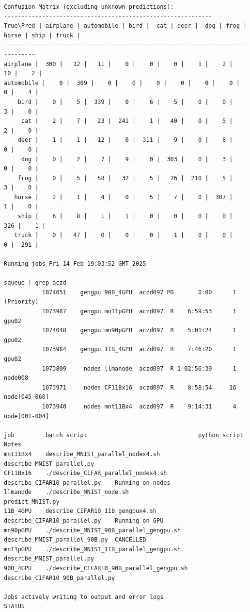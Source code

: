 \begin{verbatim}
Confusion Matrix (excluding unknown predictions):
------------------------------------------------------------
True\Pred | airplane | automobile | bird |  cat | deer |  dog | frog | horse | ship | truck |
-------------------------------------------------------------------------------
airplane |  300 |   12 |   11 |    0 |    0 |    0 |    1 |    2 |   10 |    2 |
automobile |    0 |  309 |    0 |    0 |    0 |    0 |    0 |    0 |    0 |    4 |
    bird |    0 |    5 |  339 |    0 |    6 |    5 |    0 |    0 |    3 |    0 |
     cat |    2 |    7 |   23 |  241 |    1 |   40 |    0 |    5 |    2 |    0 |
    deer |    1 |    1 |   12 |    0 |  311 |    9 |    0 |    8 |    0 |    0 |
     dog |    0 |    2 |    7 |    9 |    0 |  303 |    0 |    3 |    0 |    0 |
    frog |    0 |    5 |   58 |   32 |    5 |   26 |  210 |    5 |    3 |    0 |
   horse |    2 |    1 |    4 |    0 |    5 |    7 |    0 |  307 |    1 |    0 |
    ship |    6 |    8 |    1 |    1 |    0 |    0 |    0 |    0 |  326 |    1 |
   truck |    0 |   47 |    0 |    0 |    0 |    1 |    0 |    0 |    0 |  291 |

Running jobs Fri 14 Feb 19:03:52 GMT 2025

squeue | grep aczd
           1074051    gengpu 90B_4GPU  aczd097 PD       0:00      1 (Priority)
           1073987    gengpu mn11pGPU  aczd097  R    6:59:53      1 gpu02
           1074048    gengpu mn90pGPU  aczd097  R    5:01:24      1 gpu02
           1073984    gengpu 11B_4GPU  aczd097  R    7:46:20      1 gpu02
           1073809     nodes llmanode  aczd097  R 1-02:56:39      1 node008
           1073971     nodes CF11Bx16  aczd097  R    8:58:54     16 node[045-060]
           1073940     nodes mnt11Bx4  aczd097  R    9:14:31      4 node[001-004]

job         batch script                                python script                   Notes
mnt11Bx4    describe_MNIST_parallel_nodex4.sh           describe_MNIST_parallel.py
CF11Bx16    ./describe_CIFAR_parallel_nodex4.sh         describe_CIFAR10_parallel.py    Running on nodes
llmanode    ./describe_MNIST_node.sh                    predict_MNIST.py
11B_4GPU    describe_CIFAR10_11B_gengpux4.sh            describe_CIFAR10_parallel.py    Running on GPU     
mn90pGPU    ./describe_MNIST_90B_parallel_gengpu.sh     describe_MNIST_parallel_90B.py  CANCELLED
mn11pGPU    ./describe_MNIST_11B_parallel_gengpu.sh     describe_MNIST_parallel.py
90B_4GPU    ./describe_CIFAR10_90B_parallel_gengpu.sh   describe_CIFAR10_90B_parallel.py

Jobs actively writing to output and error logs                                  STATUS


\end{verbatim}
